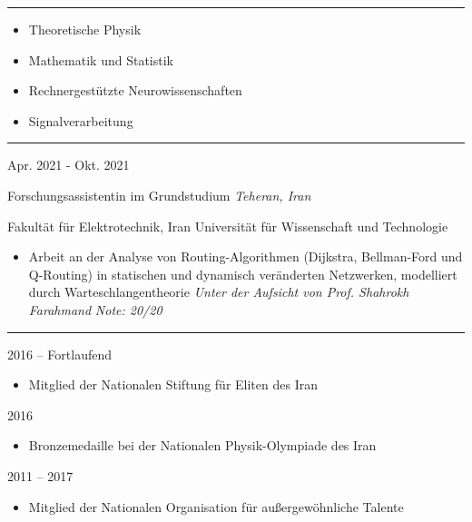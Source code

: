 \documentclass[a4paper,10pt]{article}
\newlength{\cvcolumngapwidth}
\newlength{\cvleftcolumnwidth}
\newlength{\cvrightcolumnwidth}
\newcommand{\cvsectionstyle}[1]{{\normalsize\cvsectionfont\textcolor{cvsectioncolor}{#1}}}
\newcommand{\cvtitlestyle}[1]{{\large\cvtitlefont\textcolor{cvtitlecolor}{#1}}}
\newcommand{\cvdurationstyle}[1]{{\small\cvdurationfont\textcolor{cvdurationcolor}{#1}}}
\newlength{\cvafteritemskipamount}
\newlength{\cvaftersectionskipamount}
\newlength{\cvaftertitleskipamount}
\newlength{\cvparskip}
\newcommand{\cvsection}[1]{
    \begin{minipage}[t]{\cvleftcolumnwidth}
        \raggedleft\cvsectionstyle{#1}
    \end{minipage}%
    \hspace{\cvcolumngapwidth}%
    \begin{minipage}[t]{\cvrightcolumnwidth}
        \textcolor{cvrulecolor}{\rule{\cvrightcolumnwidth}{0.3mm}}
    \end{minipage}

    \vspace{\cvaftersectionskipamount}
}
\newcommand{\cvitem}[2]{
    \begin{minipage}[t]{\cvleftcolumnwidth}
        \raggedleft #1
    \end{minipage}%
    \hspace{\cvcolumngapwidth}%
    \begin{minipage}[t]{\cvrightcolumnwidth}
        \setlength{\parskip}{\cvparskip} #2
    \end{minipage}

    \vspace{\cvafteritemskipamount}
}
\newcommand{\cvtitle}[1]{
    \cvtitlestyle{#1}

    \vspace{\cvaftertitleskipamount}
    \vspace{-\cvparskip}
}
\begin{document}
\cvsection{FORSCHUNGSINTERESSE}
\cvitem{\;}{
    \begin{itemize}[leftmargin=*]
        \item Theoretische Physik
        \item Mathematik und Statistik
        \item Rechnergestützte Neurowissenschaften
        \item Signalverarbeitung
    \end{itemize}
}

\cvsection{FORSCHUNGSERFAHRUNG}
\cvitem{
    \cvdurationstyle{Apr. 2021 - Okt. 2021}
}{
    \cvtitle{{Forschungsassistentin im Grundstudium} \hfill{\textnormal{\textit{Teheran, Iran}}}}
    {Fakultät für Elektrotechnik, Iran Universität für Wissenschaft und Technologie}
    \begin{itemize}[leftmargin=*]
        \item Arbeit an der Analyse von Routing-Algorithmen (Dijkstra, Bellman-Ford und Q-Routing) in statischen und dynamisch veränderten Netzwerken, modelliert durch Warteschlangentheorie
              \newline
              \textit{\small{Unter der Aufsicht von Prof. Shahrokh Farahmand}}
              \newline
              \textit{\small{Note: 20/20}}
    \end{itemize}
}

\cvsection{AUSZEICHNUNGEN UND EHRUNGEN}
\cvitem{
    \cvdurationstyle{2016 – Fortlaufend}
}{
    \begin{itemize}[leftmargin=*]
        \item Mitglied der Nationalen Stiftung für Eliten des Iran
    \end{itemize}
}
\vspace{-4mm}
\cvitem{
    \cvdurationstyle{2016}
}{
    \begin{itemize}[leftmargin=*]
        \item Bronzemedaille bei der Nationalen Physik-Olympiade des Iran
    \end{itemize}
}
\vspace{-4mm}
\cvitem{
    \cvdurationstyle{2011 – 2017}
}{
    \begin{itemize}[leftmargin=*]
        \item Mitglied der Nationalen Organisation für außergewöhnliche Talente
    \end{itemize}
}

\end{document}
